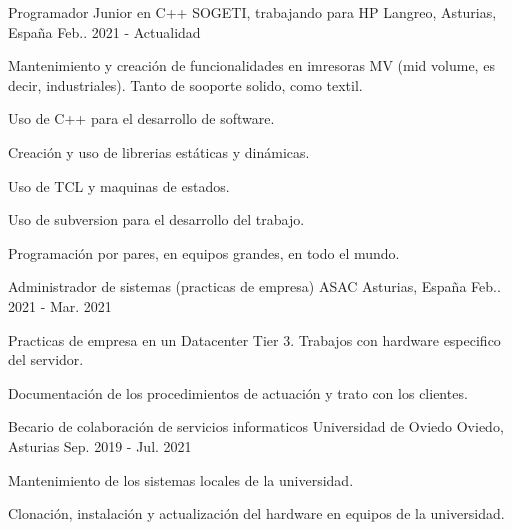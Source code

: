 

\begin{cventries}

  \cventry
    {Programador Junior en C++} %
    {SOGETI, trabajando para HP} %
    {Langreo, Asturias, España} %
    {Feb.. 2021 - Actualidad} %
    {
      \begin{cvitems} %
        \item {Mantenimiento y creación de funcionalidades en imresoras MV (mid volume, es decir, industriales).
            Tanto de sooporte solido, como textil.}
        \item {Uso de C++ para el desarrollo de software.}
        \item {Creación y uso de librerias estáticas y dinámicas.}
        \item {Uso de TCL y maquinas de estados.}
        \item {Uso de subversion para el desarrollo del trabajo.}
        \item {Programación por pares, en equipos grandes, en todo el mundo.}
      \end{cvitems}
    }

  \cventry
    {Administrador de sistemas (practicas de empresa)} %
    {ASAC} %
    {Asturias, España} %
    {Feb.. 2021 - Mar. 2021} %
    {
      \begin{cvitems} %
        \item {Practicas de empresa en un Datacenter Tier 3. Trabajos con hardware especifico del servidor.}
        \item {Documentación de los procedimientos de actuación y trato con los clientes.}
      \end{cvitems}
    }

  \cventry
    {Becario de colaboración de servicios informaticos} %
    {Universidad de Oviedo} %
    {Oviedo, Asturias} %
    {Sep. 2019 - Jul. 2021} %
    {
      \begin{cvitems} %
        \item {Mantenimiento de los sistemas locales de la universidad.}
        \item {Clonación, instalación y actualización del hardware en equipos de la universidad.}
      \end{cvitems}
    }

\end{cventries}
